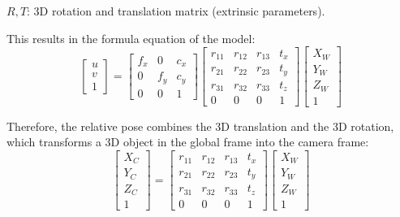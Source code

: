 $R, T$: 3D rotation and translation matrix (extrinsic parameters).

This results in the formula equation of the model:
\[
\begin{bmatrix}
    u \\
    v \\
    1
\end{bmatrix}
=
\begin{bmatrix}
    f_{x} &  0      & c_{x} \\
    0     &  f_{y}  & c_{y} \\
    0     &  0      & 1
\end{bmatrix}
\begin{bmatrix}
    r_{11} &  r_{12} & r_{13} & t_{x} \\
    r_{21} &  r_{22} & r_{23} & t_{y} \\
    r_{31} &  r_{32} & r_{33} & t_{z} \\
    0      &  0      & 0      & 1
\end{bmatrix}
\begin{bmatrix}
    X_{W} \\
    Y_{W} \\
    Z_{W} \\
    1
\end{bmatrix}
\]

Therefore, the relative pose combines the 3D translation and the 3D rotation, which transforms a 3D object in the global frame into the camera frame:
\[
\begin{bmatrix}
    X_{C} \\
    Y_{C} \\
    Z_{C} \\
    1
\end{bmatrix}
=
\begin{bmatrix}
    r_{11} &  r_{12} & r_{13} & t_{x} \\
    r_{21} &  r_{22} & r_{23} & t_{y} \\
    r_{31} &  r_{32} & r_{33} & t_{z} \\
    0      &  0      & 0      & 1
\end{bmatrix}
\begin{bmatrix}
    X_{W} \\
    Y_{W} \\
    Z_{W} \\
    1
\end{bmatrix}
\]

\clearpage
